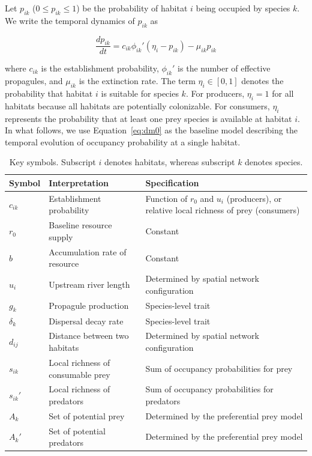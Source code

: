 \documentclass[11pt, class=article, crop=false]{standalone}
\theoremstyle{definition}
\begin{document}
Let $p_{ik}$ ($0 \le p_{ik} \le 1$) be the probability of habitat $i$ being occupied by species $k$.
We write the temporal dynamics of $p_{ik}$ as

\begin{equation}
    \frac{d p_{ik}}{d t} = c_{ik} \phi_{ik}'(\eta_i - p_{ik}) - \mu_{ik} p_{ik}
    \label{eq:dm0}
\end{equation}

where $c_{ik}$ is the establishment probability, $\phi_{ik}'$ is the number of effective propagules, and $\mu_{ik}$ is the extinction rate.
The term $\eta_i \in [0,1]$ denotes the probability that habitat $i$ is suitable for species $k$.
For producers, $\eta_i=1$ for all habitats because all habitats are potentially colonizable.
For consumers, $\eta_i$ represents the probability that at least one prey species is available at habitat $i$.
In what follows, we use Equation~\ref{eq:dm0} as the baseline model describing the temporal evolution of occupancy probability at a single habitat.

\begin{table}
    \caption{Key symbols. Subscript $i$ denotes habitats, whereas subscript $k$ denotes species.}
    \centering
    \begin{tabularx}{\textwidth}{llX}
    \hline
    Symbol & Interpretation & Specification \\
    \hline
    $c_{ik}$ & Establishment probability &
    Function of $r_0$ and $u_i$ (producers), or relative local richness of prey (consumers) \\
    $r_0$ & Baseline resource supply &
    Constant \\
    $b$ & Accumulation rate of resource &
    Constant \\
    $u_i$ & Upstream river length &
    Determined by spatial network configuration \\
    $g_k$ & Propagule production &
    Species-level trait \\
    $\delta_k$ & Dispersal decay rate &
    Species-level trait \\
    $d_{ij}$ & Distance between two habitats &
    Determined by spatial network configuration \\
    $s_{ik}$ & Local richness of consumable prey &
    Sum of occupancy probabilities for prey \\
    $s_{ik}'$ & Local richness of predators &
    Sum of occupancy probabilities for predators \\
    $A_k$ & Set of potential prey &
    Determined by the preferential prey model \\
    $A_k'$ & Set of potential predators &
    Determined by the preferential prey model \\
    \hline
    \end{tabularx}
    \label{tab:symbol-model}
\end{table}
\end{document}
